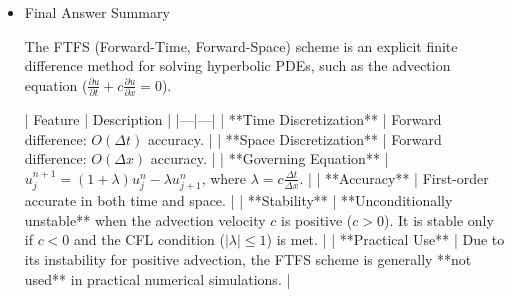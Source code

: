 \documentclass[12pt,a4paper]{report}
\begin{document}
\begin{itemize}
***

\item  Final Answer Summary

The FTFS (Forward-Time, Forward-Space) scheme is an explicit finite difference method for solving hyperbolic PDEs, such as the advection equation ($\frac{\partial u}{\partial t} + c \frac{\partial u}{\partial x} = 0$).

| Feature | Description |
|---|---|
| **Time Discretization** | Forward difference: $O(\Delta t)$ accuracy. |
| **Space Discretization** | Forward difference: $O(\Delta x)$ accuracy. |
| **Governing Equation** | $u_j^{n+1} = (1 + \lambda) u_j^n - \lambda u_{j+1}^n$, where $\lambda = c \frac{\Delta t}{\Delta x}$. |
| **Accuracy** | First-order accurate in both time and space. |
| **Stability** | **Unconditionally unstable** when the advection velocity $c$ is positive ($c>0$). It is stable only if $c<0$ and the CFL condition ($|\lambda| \le 1$) is met. |
| **Practical Use** | Due to its instability for positive advection, the FTFS scheme is generally **not used** in practical numerical simulations. |


\end{itemize}
\end{document}
